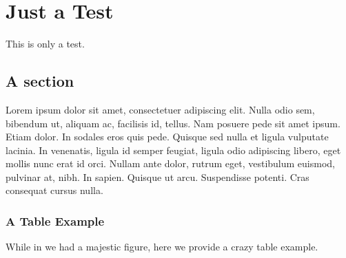 \documentclass[12pt,chapterheads]{ucsd}
\begin{document}
%







%   
%   
%










\chapter{Just a Test}
This is only a test.
\section{A section}
Lorem ipsum dolor sit amet, consectetuer adipiscing elit. Nulla odio
sem, bibendum ut, aliquam ac, facilisis id, tellus. Nam posuere pede
sit amet ipsum. Etiam dolor. In sodales eros quis pede.  Quisque sed
nulla et ligula vulputate lacinia. In venenatis, ligula id semper
feugiat, ligula odio adipiscing libero, eget mollis nunc erat id orci.
Nullam ante dolor, rutrum eget, vestibulum euismod, pulvinar at, nibh.
In sapien. Quisque ut arcu. Suspendisse potenti. Cras consequat cursus
nulla.

\subsection{A Table Example}

While in we had a majestic figure, here we provide a crazy table example.
\end{document}
